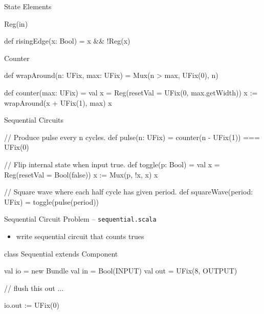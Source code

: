 \documentclass[xcolor=pdflatex,dvipsnames,table]{beamer}
\begin{document}
\begin{frame}[fragile]{State Elements}

\begin{scala}
Reg(in)
\end{scala}

\begin{scala}
def risingEdge(x: Bool) = x && !Reg(x)
\end{scala}

\end{frame}

\begin{frame}[fragile]{Counter}

\begin{scala}
def wrapAround(n: UFix, max: UFix) =
  Mux(n > max, UFix(0), n)

def counter(max: UFix) = {
  val x = Reg(resetVal = UFix(0, max.getWidth))
  x := wrapAround(x + UFix(1), max)
  x
}
\end{scala}

\end{frame}

\begin{frame}[fragile]{Sequential Circuits}

\begin{scala}
// Produce pulse every n cycles.
def pulse(n: UFix) = counter(n - UFix(1)) === UFix(0)
\end{scala}

\begin{scala}
// Flip internal state when input true.
def toggle(p: Bool) = {
  val x = Reg(resetVal = Bool(false))
  x := Mux(p, !x, x)
  x
}
\end{scala}

\begin{scala}
// Square wave where each half cycle has given period.
def squareWave(period: UFix) = toggle(pulse(period))
\end{scala}

\end{frame}

\begin{frame}[fragile]{Sequential Circuit Problem -- \tt sequential.scala}
\begin{itemize}
\item write sequential circuit that counts trues 
\end{itemize}
\begin{scala}
class Sequential extends Component {
  val io = new Bundle {
    val in  = Bool(INPUT)
    val out = UFix(8, OUTPUT)
  }

  // flush this out ...

  io.out := UFix(0)
}
\end{scala}
\end{frame}
\end{document}
